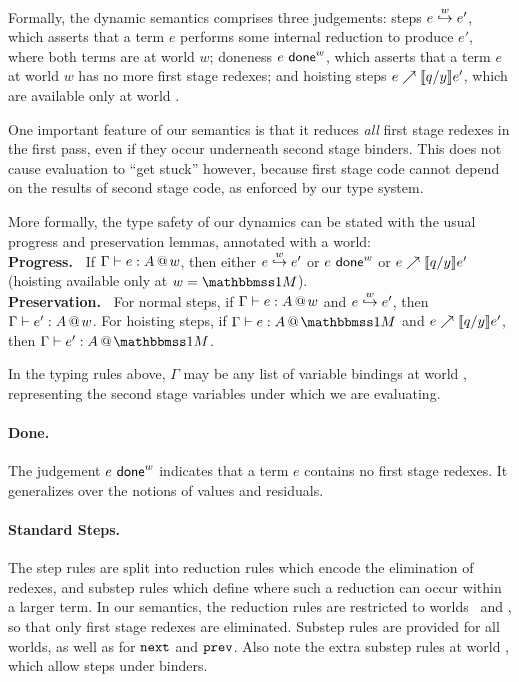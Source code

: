 Formally, the dynamic semantics comprises three judgements: 
steps ${e}\overset{w}\hookrightarrow {e}'$, which asserts that a term $e$ performs some internal reduction to produce $e'$,
where both terms are at world $w$;
doneness $e \ \mathsf{done}^{w}$, which asserts that a term $e$ at world $w$ has no more first stage redexes;
and hoisting steps ${e}\nearrow \llbracket q/y \rrbracket{e'}$, which are available only at world \bbonem.

One important feature of our semantics is that it reduces {\em all} first stage redexes
in the first pass, even if they occur underneath second stage binders.
This does not cause evaluation to ``get stuck'' however, 
because first stage code cannot depend on the results of second stage code,
as enforced by our type system.

More formally, the type safety of our dynamics can be stated
with the usual progress and preservation lemmas, annotated with a world:
\\{\bf Progress.~} If $\Gamma{} \vdash {e}:{A}~\hspace{-0.15em}\text{@}\hspace{-0.2em}~w$, then either 
${e}\overset{w}\hookrightarrow {e'}$ or $e \ \mathsf{done}^{w}$ or ${e}\nearrow \llbracket q/y \rrbracket{e'}$ (hoisting available only at $w = \bbonem$).
\\{\bf Preservation.~} For normal steps, if $\Gamma{} \vdash {e}:{A}~\hspace{-0.15em}\text{@}\hspace{-0.2em}~w$ and ${e}\overset{w}\hookrightarrow {e'}$, then $\Gamma{} \vdash {e'}:{A}~\hspace{-0.15em}\text{@}\hspace{-0.2em}~w$. 
For hoisting steps, if $\typesone e A$ and ${e}\nearrow \llbracket q/y \rrbracket{e'}$, then $\typesone {e'} A$.

In the typing rules above, $\Gamma$ may be any list of variable bindings at world \bbtwo,
representing the second stage variables under which we are evaluating.

\paragraph{Done.} The judgement $e \ \mathsf{done}^{w}$ indicates that a term $e$ contains no first stage redexes.
It generalizes over the notions of values and residuals.

\paragraph{Standard Steps.} The step rules are split into reduction rules
which encode the elimination of redexes, 
and substep rules which define where such a reduction can occur within a larger term.
In our semantics, the reduction rules are restricted to worlds \bbonep\ and \bbonem,
so that only first stage redexes are eliminated.
Substep rules are provided for all worlds, as well as for ${\tt next}$ and ${\tt prev}$.
Also note the extra substep rules at world \bbtwo, which allow steps under binders.

